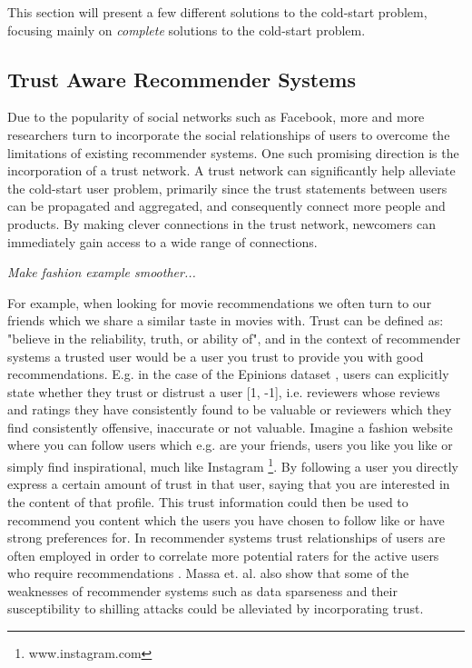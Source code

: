 
This section will present a few different solutions to the cold-start problem, focusing mainly on \emph{complete} solutions to the cold-start problem.

\subsection{Trust Aware Recommender Systems}

Due to the popularity of social networks such as Facebook, more and more
researchers turn to incorporate the social relationships of users to overcome
the limitations of existing recommender systems. One such promising direction is
the incorporation of a trust network. A trust network can significantly help alleviate
the cold-start user problem, primarily since the trust statements between users can be propagated
and aggregated, and consequently connect more people and products. By making clever connections in
the trust network, newcomers can immediately gain access to a wide range of connections.


\emph{Make fashion example smoother...}

For example, when looking for movie recommendations we often turn to our friends which we share a similar
taste in movies with. Trust can be defined as: "believe in the reliability, truth, or ability of", and in
the context of recommender systems a trusted user would be a user you trust to provide you with good recommendations.
E.g. in the case of the Epinions dataset \cite{Epinions}, users can explicitly state whether they trust or distrust a
user [1, -1], i.e. reviewers whose reviews and ratings they have consistently found to be valuable or reviewers which
they find consistently offensive, inaccurate or not valuable.
Imagine a fashion website where you can follow users which e.g. are your friends, users you like you like or simply
find inspirational, much like Instagram \footnote{www.instagram.com}. By following a user you directly express a
certain amount of trust in that user, saying that you are interested in the content of that profile. This
trust information could then be used to recommend you content which the users you have chosen to follow like
or have strong preferences for. In recommender systems trust relationships of users are often employed in order to correlate
more potential raters for the active users who require recommendations \cite{Massa2004, Massa2007}. Massa et. al. \cite{Massa2004}
also show that some of the weaknesses of recommender systems such as data sparseness and their susceptibility to shilling attacks
could be alleviated by incorporating trust.


